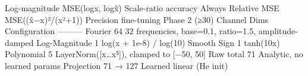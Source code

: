 {}\markdownRendererPipe{} Log-magnitude \markdownRendererPipe{} MSE(log\markdownRendererPipe{}x\markdownRendererPipe{}, log\markdownRendererPipe{}x̂\markdownRendererPipe{}) \markdownRendererPipe{} Scale-ratio accuracy \markdownRendererPipe{} Always \markdownRendererPipe{}\markdownRendererSoftLineBreak
{}\markdownRendererPipe{} Relative MSE \markdownRendererPipe{} MSE((x̂−x)²/(x²+1)) \markdownRendererPipe{} Precision fine-tuning \markdownRendererPipe{} Phase 2 (≥30\markdownRendererPercentSign{}) \markdownRendererPipe{}\markdownRendererInterblockSeparator
{}\markdownRendererThematicBreak{}\markdownRendererInterblockSeparator
{}
\markdownRendererSectionEnd 
\markdownRendererSectionEnd \markdownRendererSectionBegin
{}\markdownRendererInterblockSeparator
{}\markdownRendererSectionBegin
{}\markdownRendererInterblockSeparator
{}\markdownRendererInterblockSeparator
{}
\markdownRendererSectionEnd \markdownRendererSectionBegin
{}\markdownRendererInterblockSeparator
{}\markdownRendererPipe{} Channel \markdownRendererPipe{} Dims \markdownRendererPipe{} Configuration \markdownRendererPipe{}\markdownRendererSoftLineBreak
{}\markdownRendererPipe{}---\markdownRendererPipe{}---\markdownRendererPipe{}---\markdownRendererPipe{}\markdownRendererSoftLineBreak
{}\markdownRendererPipe{} Fourier \markdownRendererPipe{} 64 \markdownRendererPipe{} 32 frequencies, base=0.1, ratio=1.5, amplitude-damped \markdownRendererPipe{}\markdownRendererSoftLineBreak
{}\markdownRendererPipe{} Log-Magnitude \markdownRendererPipe{} 1 \markdownRendererPipe{} log(\markdownRendererPipe{}x\markdownRendererPipe{} + 1e-8) / log(10) \markdownRendererPipe{}\markdownRendererSoftLineBreak
{}\markdownRendererPipe{} Smooth Sign \markdownRendererPipe{} 1 \markdownRendererPipe{} tanh(10x) \markdownRendererPipe{}\markdownRendererSoftLineBreak
{}\markdownRendererPipe{} Polynomial \markdownRendererPipe{} 5 \markdownRendererPipe{} LayerNorm([x…x⁵]), clamped to [−50, 50] \markdownRendererPipe{}\markdownRendererSoftLineBreak
{}\markdownRendererPipe{} Raw total \markdownRendererPipe{} 71 \markdownRendererPipe{} Analytic, no learned params \markdownRendererPipe{}\markdownRendererSoftLineBreak
{}\markdownRendererPipe{} Projection \markdownRendererPipe{} 71 → 127 \markdownRendererPipe{} Learned linear (He init) \markdownRendererPipe{}\markdownRendererSoftLineBreak
